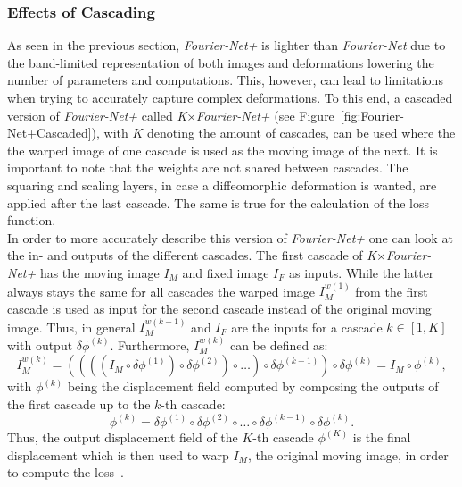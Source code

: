 \subsubsection{Effects of Cascading} \label{SubSubSec:EffectsCascading}
As seen in the previous section, \emph{Fourier-Net+} is lighter than \emph{Fourier-Net} due to the band-limited representation of both images and deformations lowering the number of parameters and computations. This, however, can lead to limitations when trying to accurately capture complex deformations. To this end, a cascaded version of \emph{Fourier-Net+} called \emph{K$\times$Fourier-Net+} (see Figure~\ref{fig:Fourier-Net+Cascaded}), with $K$ denoting the amount of cascades, can be used where the the warped image of one cascade is used as the moving image of the next. It is important to note that the weights are not shared between cascades. The squaring and scaling layers, in case a diffeomorphic deformation is wanted, are applied after the last cascade. The same is true for the calculation of the loss function.\\
In order to more accurately describe this version of \emph{Fourier-Net+} one can look at the in- and outputs of the different cascades. The first cascade of \emph{K$\times$Fourier-Net+} has the moving image $I_M$ and fixed image $I_F$ as inputs. While the latter always stays the same for all cascades the warped image $I_M^{w(1)}$ from the first cascade is used as input for the second cascade instead of the original moving image. Thus, in general $I_M^{w(k-1)}$ and $I_F$ are the inputs for a cascade $k \in [1, K]$ with output $\delta \phi^{(k)}$. Furthermore, $I_M^{w(k)}$ can be defined as:
\begin{equation}
	I_M^{w(k)} = ((((I_M \circ \delta \phi^{(1)}) \circ \delta \phi^{(2)}) \circ \dots ) \circ \delta \phi^{(k-1)}) \circ \delta \phi^{(k)} = I_M \circ  \phi^{(k)},
\end{equation}
with $\phi^{(k)}$ being the displacement field computed by composing the outputs of the first cascade up to the $k$-th cascade:
\begin{equation}
	\phi^{(k)} = \delta \phi^{(1)} \circ \delta \phi^{(2)} \circ \dots \circ \delta \phi^{(k-1)} \circ \delta \phi^{(k)}.
\end{equation}
Thus, the output displacement field of the $K$-th cascade $\phi^{(K)}$ is the final displacement which is then used to warp $I_M$, the original moving image, in order to compute the loss~\cite{Fourier-Net+}.

